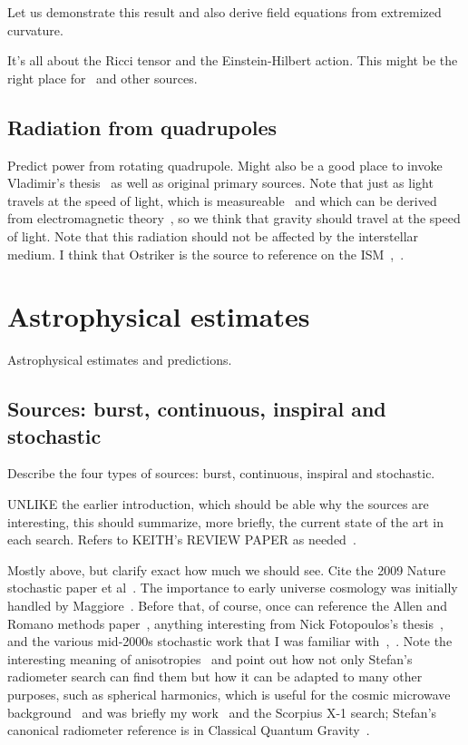 Let us demonstrate this result and also derive field equations from extremized curvature.

		It's all about the Ricci tensor and the Einstein-Hilbert action. This might be the right place for~\cite{FarrThesis} and other sources.

        \subsection{Radiation from quadrupoles}
        \label{radiation}
  
            Predict power from rotating quadrupole. Might also be a good place to invoke Vladimir's thesis~\cite{DergachevThesis} as well as original primary sources. Note that just as light travels at the speed of light, which is measureable~\cite{CODATA} and which can be derived from electromagnetic theory~\cite{GriffithsE}, so we think that gravity should travel at the speed of light. Note that this radiation should not be affected by the interstellar medium. I think that Ostriker is the source to reference on the ISM~\cite{Caldwell1981},~\cite{McKee1977}.

    \section{Astrophysical estimates}
    \label{estimates}

        Astrophysical estimates and predictions.

        \subsection{Sources: burst, continuous, inspiral and stochastic}
        \label{source_types}

            Describe the four types of sources: burst, continuous, inspiral and stochastic.

            UNLIKE the earlier introduction, which should be able why the sources are interesting, this should summarize, more briefly, the current state of the art in each search. Refers to KEITH's REVIEW PAPER as needed~\cite{Riles2013}.

		Mostly above, but clarify exact how much we should see. Cite the 2009 Nature stochastic paper et al~\cite{LIGOStochasticNature2009}. The importance to early universe cosmology was initially handled by Maggiore~\cite{Maggiore2000}. Before that, of course, once can reference the Allen and Romano methods paper~\cite{Allen1999}, anything interesting from Nick Fotopoulos's thesis~\cite{FotopoulosThesis}, and the various mid-2000s stochastic work that I was familiar with~\cite{Abbott2006},~\cite{Abbott2007}. Note the interesting meaning of anisotropies~\cite{Allen1997} and point out how not only Stefan's radiometer search can find them but how it can be adapted to many other purposes, such as spherical harmonics, which is useful for the cosmic microwave background~\cite{Muciaccia1997} and was briefly my work~\cite{MeadorsCaltech2007} and the Scorpius X-1 search; Stefan's canonical radiometer reference is in Classical Quantum Gravity~\cite{Radiometer2006}.

